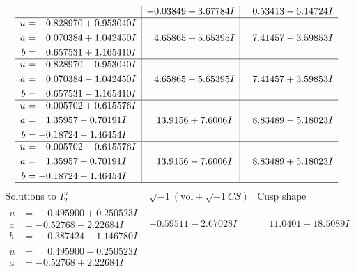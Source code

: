 \documentclass[1p]{elsarticle_modified}
\theoremstyle{definition}
\newcommand{\I}{\sqrt{-1}}
\begin{document}
$$\begin{array}{c|c|c}
 & -0.03849 + 3.67784 I & \phantom{-}0.53413 - 6.14724 I \\ \hline\begin{aligned}
u &= -0.828970 + 0.953040 I \\
a &= \phantom{-}0.070384 + 1.042450 I \\
b &= \phantom{-}0.657531 + 1.165410 I\end{aligned}
 & \phantom{-}4.65865 + 5.65395 I & \phantom{-}7.41457 - 3.59853 I \\ \hline\begin{aligned}
u &= -0.828970 - 0.953040 I \\
a &= \phantom{-}0.070384 - 1.042450 I \\
b &= \phantom{-}0.657531 - 1.165410 I\end{aligned}
 & \phantom{-}4.65865 - 5.65395 I & \phantom{-}7.41457 + 3.59853 I \\ \hline\begin{aligned}
u &= -0.005702 + 0.615576 I \\
a &= \phantom{-}1.35957 - 0.70191 I \\
b &= -0.18724 - 1.46454 I\end{aligned}
 & \phantom{-}13.9156 + 7.6006 I & \phantom{-}8.83489 - 5.18023 I \\ \hline\begin{aligned}
u &= -0.005702 - 0.615576 I \\
a &= \phantom{-}1.35957 + 0.70191 I \\
b &= -0.18724 + 1.46454 I\end{aligned}
 & \phantom{-}13.9156 - 7.6006 I & \phantom{-}8.83489 + 5.18023 I\\
 \hline 
 \end{array}$$\newpage$$\begin{array}{c|c|c}  
\text{Solutions to }I^u_{2}& \I (\text{vol} + \sqrt{-1}CS) & \text{Cusp shape}\\
 \hline 
\begin{aligned}
u &= \phantom{-}0.495900 + 0.250523 I \\
a &= -0.52768 - 2.22684 I \\
b &= \phantom{-}0.387424 - 1.146780 I\end{aligned}
 & -0.59511 - 2.67028 I & \phantom{-}11.0401 + 18.5089 I \\ \hline\begin{aligned}
u &= \phantom{-}0.495900 - 0.250523 I \\
a &= -0.52768 + 2.22684 I \\

\end{aligned}
\end{array}$$
\end{document}

